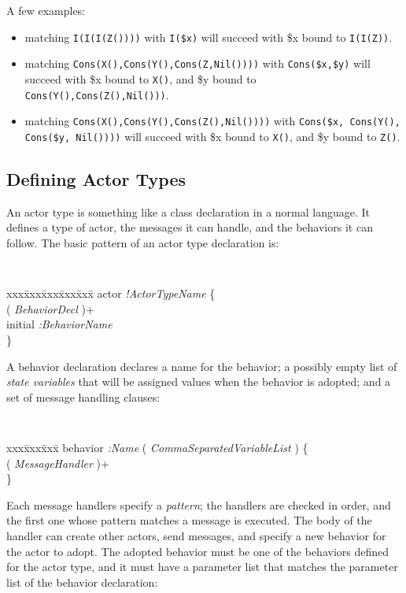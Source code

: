 \documentclass[11pt]{article}
\begin{document}
A few examples:
\begin{itemize}
\item matching {\tt I(I(I(Z())))} with {\tt I(\$x)} will succeed with \$x bound to {\tt I(I(Z))}.
\item matching {\tt Cons(X(),Cons(Y(),Cons(Z,Nil())))} with {\tt Cons(\$x,\$y)} will succeed with
   \$x bound to {\tt X()}, and \$y bound to {\tt Cons(Y(),Cons(Z(),Nil()))}.
\item matching    {\tt Cons(X(),Cons(Y(),Cons(Z(),Nil())))} with {\tt Cons(\$x, Cons(Y(), Cons(\$y, Nil())))} will succeed with \$x bound to {\tt X()}, and \$y bound to {\tt Z()}.
\end{itemize}


\subsection{Defining Actor Types}

An actor type is something like a class declaration in a normal language. It defines a type of actor, the messages it can handle, and the behaviors it can follow. The basic pattern of an actor type declaration is:

{\tt
\begin{tabbing}
xxx\=xxx\=xxx\=xxx\=xxx\=\kill
actor {\em !ActorTypeName} \{ \\
\> ( {\em BehaviorDecl} )+ \\
\> initial {\em :BehaviorName} \\
\}
\end{tabbing}}

A behavior declaration declares a name for the behavior; a possibly empty list of {\em state variables} that will be assigned values when the behavior is adopted; and a set of message handling clauses:

{\tt
\begin{tabbing}
xxx\=xxx\=xxx\=\kill
behavior {\em :Name} ( {\em CommaSeparatedVariableList} ) \{ \\
\>   ( {\em MessageHandler} )+ \\
\}
\end{tabbing}}

Each message handlers specify a {\em pattern}; the handlers are checked in order, and the first one whose pattern matches a message is executed. The body of the handler can create other actors, send messages, and specify a new behavior for the actor to adopt. The adopted behavior must be one of
the behaviors defined for the actor type, and it must have a parameter list that matches the parameter list of the behavior declaration:
\end{document}
